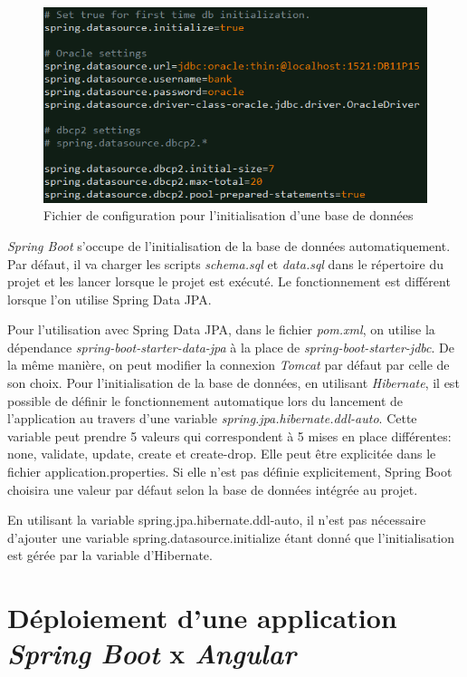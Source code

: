 \documentclass{polytech/polytech}
\begin{document}
\begin{figure}
	\includegraphics[scale=0.8]{images/bddProperties}
	\caption{Fichier de configuration pour l'initialisation d'une base de données}
	\label{fig:bddProperties}
\end{figure}

\textit{Spring Boot} s’occupe de l’initialisation de la base de données automatiquement. Par défaut, il va charger les scripts \textit{schema.sql} et \textit{data.sql} dans le répertoire du projet et les lancer lorsque le projet est exécuté. Le fonctionnement est différent lorsque l’on utilise Spring Data JPA. 

Pour l’utilisation avec Spring Data JPA, dans le fichier \textit{pom.xml}, on utilise la dépendance \textit{spring-boot-starter-data-jpa} à la place de \textit{spring-boot-starter-jdbc}. De la même manière, on peut modifier la connexion \textit{Tomcat} par défaut par celle de son choix. Pour l’initialisation de la base de données, en utilisant \textit{Hibernate}, il est possible de définir le fonctionnement automatique lors du lancement de l’application au travers d’une variable \textit{spring.jpa.hibernate.ddl-auto}. Cette variable peut prendre 5 valeurs qui correspondent à 5 mises en place différentes: none, validate, update, create et create-drop. Elle peut être explicitée dans le fichier application.properties. Si elle n’est pas définie explicitement, Spring Boot choisira une valeur par défaut selon la base de données intégrée au projet. 

En utilisant la variable spring.jpa.hibernate.ddl-auto, il n’est pas nécessaire d’ajouter une variable  spring.datasource.initialize étant donné que l’initialisation est gérée par la variable d’Hibernate.


\section{Déploiement d'une application \textit{Spring Boot} x \textit{Angular}}
\end{document}
